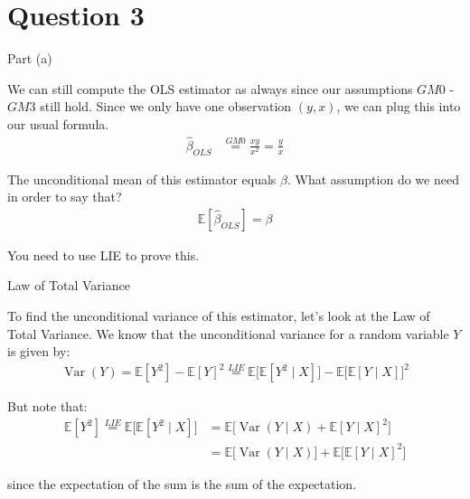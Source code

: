 \section{Question 3}

\begin{frame}{Part (a)}

    We can still compute the OLS estimator as always since our assumptions $GM0$ - $GM3$ still hold. Since we only have one observation $(y, x)$, we can plug this into our usual formula.
    \begin{align*}
        \hat{\beta}_{OLS} &\overset{GM0}{=} \frac{x y}{x^2} = \frac{y}{x}
    \end{align*}

    The unconditional mean of this estimator equals $\beta$. What assumption do we need in order to say that?
    \begin{align*}
        \mathbb{E}[\hat{\beta}_{OLS}] = \beta
    \end{align*}

    You need to use LIE to prove this.
    
\end{frame}

\begin{frame}{Law of Total Variance}

    To find the unconditional variance of this estimator, let's look at the Law of Total Variance. We know that the unconditional variance for a random variable $Y$ is given by:
    \begin{align*}
        \operatorname{Var}(Y) = \mathbb{E}[Y^2] - \mathbb{E}[Y]^2 \overset{LIE}{=} \mathbb{E} \Biggr[ \mathbb{E}[Y^2 \mid X] \Biggr] -  \mathbb{E} \Biggr[ \mathbb{E}[Y \mid X] \Biggr]^2
    \end{align*}

    But note that:
    \begin{align*}
        \mathbb{E}[Y^2] \overset{LIE}{=} \mathbb{E} \Biggr[ \mathbb{E}[Y^2 \mid X ]  \Biggr] &= \mathbb{E} \Biggr[ \operatorname{Var}(Y \mid X) + \mathbb{E}[Y \mid X ]^2 \Biggr]
        \\
        &= \mathbb{E} \Biggr[ \operatorname{Var}(Y \mid X) \Biggr] + \mathbb{E} \Biggr[ \mathbb{E}[Y \mid X ]^2 \Biggr]
    \end{align*}

    since the expectation of the sum is the sum of the expectation.
    
\end{frame}

